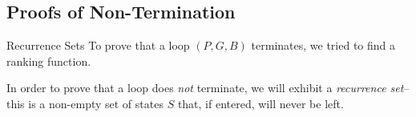 \documentclass[xcolor=pdftex,t,11pt]{beamer}
\begin{document}
\subsection{Proofs of Non-Termination}

\begin{frame}{Recurrence Sets}
 To prove that a loop $(P, G, B)$ terminates, we tried to find a ranking function.

 \vspace{1em}

 In order to prove that a loop does \emph{not} terminate, we will exhibit a \emph{recurrence set}\footnotemark --
 this is a non-empty set of states $S$ that, if entered, will never be left.

 
\end{frame}
\end{document}
